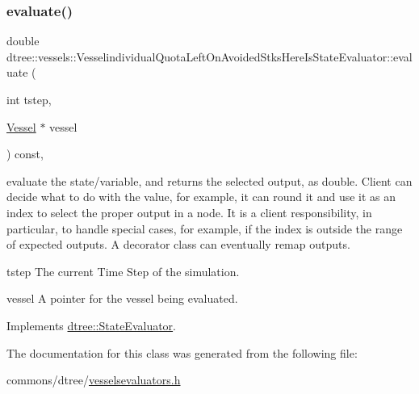 \subsubsection{\texorpdfstring{evaluate()}{evaluate()}}
{\footnotesize\ttfamily double dtree\+::vessels\+::\+Vesselindividual\+Quota\+Left\+On\+Avoided\+Stks\+Here\+Is\+State\+Evaluator\+::evaluate (\begin{DoxyParamCaption}\item[{int}]{tstep,  }\item[{\mbox{\hyperlink{class_vessel}{Vessel}} $\ast$}]{vessel }\end{DoxyParamCaption}) const\hspace{0.3cm}{\ttfamily [inline]}, {\ttfamily [virtual]}}



evaluate the state/variable, and returns the selected output, as double. Client can decide what to do with the value, for example, it can round it and use it as an index to select the proper output in a node. It is a client responsibility, in particular, to handle special cases, for example, if the index is outside the range of expected outputs. A decorator class can eventually remap outputs. 

\begin{DoxyItemize}
\item tstep The current Time Step of the simulation. \item vessel A pointer for the vessel being evaluated. \end{DoxyItemize}


Implements \mbox{\hyperlink{classdtree_1_1_state_evaluator_ab57666219fbdc728f40d9d5acd5726cb}{dtree\+::\+State\+Evaluator}}.



The documentation for this class was generated from the following file\+:\begin{DoxyCompactItemize}
\item 
commons/dtree/\mbox{\hyperlink{vesselsevaluators_8h}{vesselsevaluators.\+h}}\end{DoxyCompactItemize}
